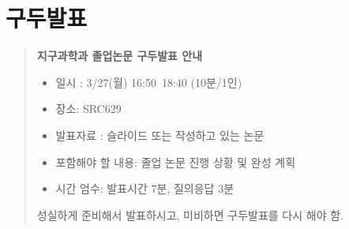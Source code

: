\section{구두발표}
\begin{quote}
    \begin{center}
    \textbf{지구과학과 졸업논문 구두발표 안내}
        \begin{itemize}
            \item 일시 : 3/27(월) 16:50~18:40 (10분/1인)
            \item 장소: SRC629
            \item 발표자료 :  슬라이드 또는 작성하고 있는 논문
            \item 포함해야 할 내용: 졸업 논문 진행 상황 및 완성 계획
            \item 시간 엄수: 발표시간 7분, 질의응답 3분
        \end{itemize}
            
        성실하게 준비해서 발표하시고, 미비하면 구두발표를 다시 해야 함.
    \end{center}
\end{quote}

